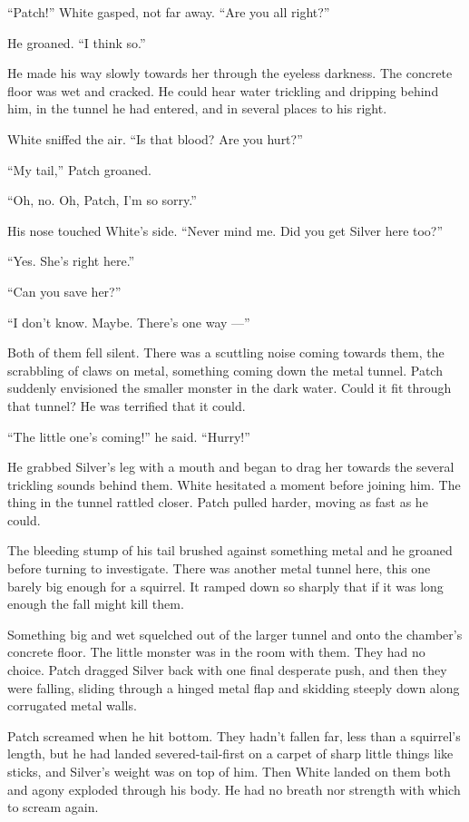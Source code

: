 \documentclass[12pt]{memoir}
\begin{document}
“Patch!” White gasped, not far away. “Are you all right?”

He groaned. “I think so.”

He made his way slowly towards her through the eyeless darkness. The
concrete floor was wet and cracked. He could hear water trickling and
dripping behind him, in the tunnel he had entered, and in several
places to his right.

White sniffed the air. “Is that blood? Are you hurt?”

“My tail,” Patch groaned.

“Oh, no. Oh, Patch, I’m so sorry.”

His nose touched White’s side. “Never mind me. Did you get Silver here
too?”

“Yes. She’s right here.”

“Can you save her?”

“I don’t know. Maybe. There’s one way —”

Both of them fell silent. There was a scuttling noise coming towards
them, the scrabbling of claws on metal, something coming down the
metal tunnel. Patch suddenly envisioned the smaller monster in the
dark water. Could it fit through that tunnel? He was terrified that it
could.

“The little one’s coming!” he said. “Hurry!”

He grabbed Silver’s leg with a mouth and began to drag her towards the
several trickling sounds behind them. White hesitated a moment before
joining him. The thing in the tunnel rattled closer. Patch pulled
harder, moving as fast as he could.

The bleeding stump of his tail brushed against something metal and he
groaned before turning to investigate. There was another metal tunnel
here, this one barely big enough for a squirrel. It ramped down so
sharply that if it was long enough the fall might kill them.

Something big and wet squelched out of the larger tunnel and onto the
chamber’s concrete floor. The little monster was in the room with
them. They had no choice. Patch dragged Silver back with one final
desperate push, and then they were falling, sliding through a hinged
metal flap and skidding steeply down along corrugated metal walls.

Patch screamed when he hit bottom. They hadn’t fallen far, less than a
squirrel’s length, but he had landed severed-tail-first on a carpet of
sharp little things like sticks, and Silver’s weight was on top of
him. Then White landed on them both and agony exploded through his
body. He had no breath nor strength with which to scream again.
\end{document}
